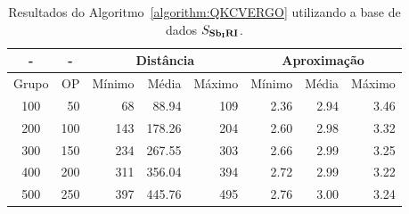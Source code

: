 \begin{table}[!htb]
  \caption{Resultados do Algoritmo~\ref{algorithm:QKCVERGO} utilizando a base de dados $S_{\textbf{Sb\textsubscript{I}RI}}{}$.}
  \label{table:GBAOFAHZ}
  \centering
  \begin{tabular}{|c|r|r|r|r|r|r|r|}
    \hline
      -      & \multicolumn{1}{c|}{-} & \multicolumn{3}{c|}{Distância}             & \multicolumn{3}{c|}{Aproximação}           \\ \hline
    Grupo    & OP                     & Mínimo       & Média        & Máximo       & Mínimo       & Média        & Máximo       \\ \hline  
    100      & 50                     & 68           & 88.94        & 109          & 2.36         & 2.94         & 3.46         \\ \hline
    200      & 100                    & 143          & 178.26       & 204          & 2.60         & 2.98         & 3.32         \\ \hline
    300      & 150                    & 234          & 267.55       & 303          & 2.66         & 2.99         & 3.25         \\ \hline
    400      & 200                    & 311          & 356.04       & 394          & 2.72         & 2.99         & 3.22         \\ \hline
    500      & 250                    & 397          & 445.76       & 495          & 2.76         & 3.00         & 3.24         \\ \hline    
  \end{tabular}
\end{table}
